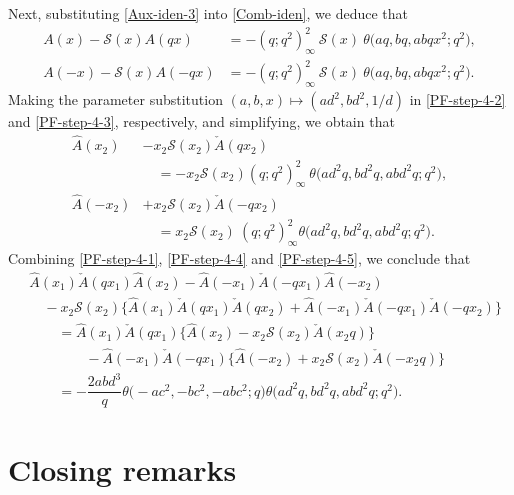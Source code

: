 \documentclass[12pt,reqno]{amsart}
\numberwithin{equation}{section}
\theoremstyle{plain}
\theoremstyle{definition}
\begin{document}
Next, substituting \eqref{Aux-iden-3} into \eqref{Comb-iden}, we deduce that
\begin{align}
A(x)-\mathscr{S}(x)A(qx) &=-(q;q^2)_\infty^2\!\:\mathscr{S}(x)\!\:\theta\big(aq,
bq,abqx^2;q^2\big),\label{PF-step-4-2}\\
A(-x)-\mathscr{S}(x)A(-qx) &=-(q;q^2)_\infty^2\!\:\mathscr{S}(x)\!\:\theta\big(aq,
bq,abqx^2;q^2\big).\label{PF-step-4-3}
\end{align}
Making the parameter substitution $(a,b,x)\mapsto(ad^2,bd^2,1/d)$ in
\eqref{PF-step-4-2} and \eqref{PF-step-4-3}, respectively, and simplifying, we obtain
that
\begin{align}
\hat{A}(x_2) &-x_2\mathscr{S}(x_2)\check{A}(qx_2)\nonumber\\
 &\quad=-x_2\mathscr{S}(x_2)(q;q^2)_\infty^2\!\:\theta\big(ad^2q,bd^2q,abd^2q;q^2\big),
\label{PF-step-4-4}\\
\hat{A}(-x_2) &+x_2\mathscr{S}(x_2)\check{A}(-qx_2)\nonumber\\
 &\quad=x_2\mathscr{S}(x_2)\!\:(q;q^2)_\infty^2\theta\big(ad^2q,bd^2q,abd^2q;q^2\big).
\label{PF-step-4-5}
\end{align}
Combining \eqref{PF-step-4-1}, \eqref{PF-step-4-4} and \eqref{PF-step-4-5}, we conclude
that
\begin{align*}
 &\hat{A}(x_1)\check{A}(qx_1)\hat{A}(x_2)-\hat{A}(-x_1)\check{A}(-qx_1)\hat{A}(-x_2)\\
 &\quad-x_2\mathscr{S}(x_2)\big\{\hat{A}(x_1)\check{A}(qx_1)\check{A}(qx_2)
+\hat{A}(-x_1)\check{A}(-qx_1)\check{A}(-qx_2)\big\}\nonumber\\
 &\qquad=\hat{A}(x_1)\check{A}(qx_1)\big\{\hat{A}(x_2)-x_2\mathscr{S}(x_2)
\check{A}(x_2q)\big\}\\
 &\qquad\qquad-\hat{A}(-x_1)\check{A}(-qx_1)\big\{\hat{A}(-x_2)+x_2\mathscr{S}(x_2)
\check{A}(-x_2q)\big\}\\
 &\qquad=-\dfrac{2abd^3}{q}\theta\big({-}ac^2,-bc^2,-abc^2;q\big)
\theta\big(ad^2q,bd^2q,abd^2q;q^2\big).
\end{align*}





\section{Closing remarks}
\end{document}
